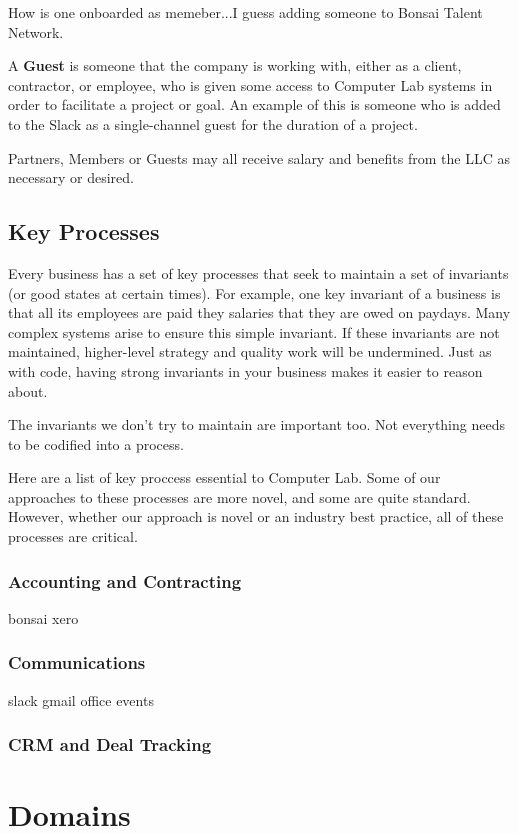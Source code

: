 \documentclass[12pt]{article}
\begin{document}
How is one onboarded as memeber...I guess adding someone to Bonsai Talent
Network.

A \textbf{Guest} is someone that the company is working with, either as a client,
contractor, or employee, who is given some access to Computer Lab systems in
order to facilitate a project or goal.  An example of this is someone who is
added to the Slack as a single-channel guest for the duration of a project.

Partners, Members or Guests may all receive salary and benefits from
the LLC as necessary or desired.

\subsection{Key Processes}
Every business has a set of key processes that seek to maintain a set of
invariants (or good states at certain times). For example, one key invariant of
a business is that all its employees are paid they salaries that they are owed
on paydays. Many complex systems arise to ensure this simple invariant.
If these invariants are not maintained, higher-level strategy and quality work
will be undermined. Just as with code, having strong invariants in your business
makes it easier to reason about.

The invariants we don't try to maintain are important too. Not everything needs
to be codified into a process.

Here are a list of key proccess essential to Computer Lab. Some of our
approaches to these processes are more novel, and some are quite standard.
However, whether our approach is novel or an industry best practice, all of
these processes are critical.

\subsubsection{Accounting and Contracting}
bonsai
xero

\subsubsection{Communications}
slack gmail office events

\subsubsection{CRM and Deal Tracking}

\section{Domains}
\end{document}
